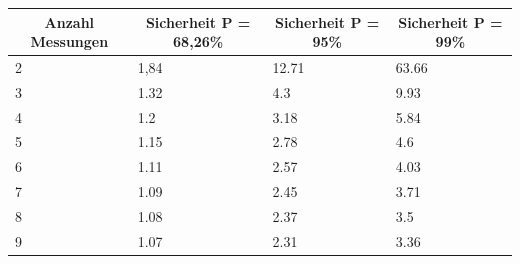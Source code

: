 \documentclass[TGAI_Laborbericht.tex]{subfiles}
\begin{document}
\begin{table}[H]
\begin{tabular}{|l|l|l|l|}
\hline
\multicolumn{1}{|c|}{Anzahl Messungen} & \multicolumn{1}{c|}{Sicherheit P = 68,26\%} & \multicolumn{1}{c|}{Sicherheit P = 95\%} & \multicolumn{1}{c|}{Sicherheit P = 99\%} \\ \hline
2                                                              & 1,84                                                                & 12.71                                                            & 63.66                                                            \\ \hline
3                                                              & 1.32                                                                & 4.3                                                              & 9.93                                                             \\ \hline
4                                                              & 1.2                                                                 & 3.18                                                             & 5.84                                                             \\ \hline
5                                                              & 1.15                                                                & 2.78                                                             & 4.6                                                              \\ \hline
6                                                              & 1.11                                                                & 2.57                                                             & 4.03                                                             \\ \hline
7                                                              & 1.09                                                                & 2.45                                                             & 3.71                                                             \\ \hline
8                                                              & 1.08                                                                & 2.37                                                             & 3.5                                                              \\ \hline
9                                                              & 1.07                                                                & 2.31                                                             & 3.36                                                             \\ \hline

\end{tabular}
\end{table}
\end{document}
